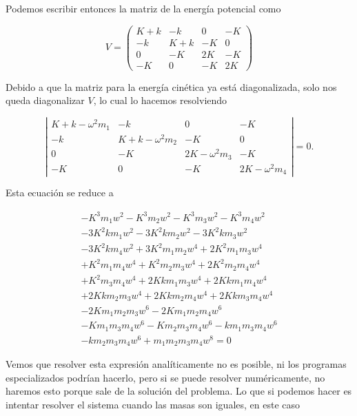 \documentclass[a4paper,10pt]{article}
\numberwithin{equation}{section}
\begin{document}
Podemos escribir entonces la matriz de la energía potencial como

\begin{equation}
 V = \begin{pmatrix}
      K+k & -k & 0 & -K \\
      -k & K+k & - K & 0 \\
      0 & - K & 2K & - K \\
      -K & 0 & - K & 2K
     \end{pmatrix}
\end{equation}

Debido a que la matriz para la energía cinética ya está diagonalizada, solo nos queda 
diagonalizar $V$, lo cual lo hacemos resolviendo

\begin{equation}
 \left|\begin{matrix}
      K+k - \omega^2m_1 & -k & 0 & -K \\
      -k & K+k - \omega^2m_2 & - K & 0 \\
      0 & - K & 2K -  \omega^2m_3 & - K \\
      -K & 0 & - K & 2K -  \omega^2m_4
     \end{matrix}\right| = 0.
\end{equation}

Esta ecuación se reduce a 

\begin{align}
 - K^{3} m_{1} w^{2} - K^{3} m_{2} w^{2} - K^{3} m_{3} w^{2} - K^{3} m_{4} w^{2} \\
 - 3 K^{2} k m_{1} w^{2} - 3 K^{2} k m_{2} w^{2} - 3 K^{2} k m_{3} w^{2} \\
 - 3 K^{2} k m_{4} w^{2} + 3 K^{2} m_{1} m_{2} w^{4} + 2 K^{2} m_{1} m_{3} w^{4}\\
 + K^{2} m_{1} m_{4} w^{4} + K^{2} m_{2} m_{3} w^{4} + 2 K^{2} m_{2} m_{4} w^{4} \\
 + K^{2} m_{3} m_{4} w^{4} + 2 K k m_{1} m_{3} w^{4} + 2 K k m_{1} m_{4} w^{4} \\
 + 2 K k m_{2} m_{3} w^{4} + 2 K k m_{2} m_{4} w^{4} + 2 K k m_{3} m_{4} w^{4} \\
 - 2 K m_{1} m_{2} m_{3} w^{6} - 2 K m_{1} m_{2} m_{4} w^{6} \\
 - K m_{1} m_{3} m_{4} w^{6} - K m_{2} m_{3} m_{4} w^{6} - k m_{1} m_{3} m_{4} w^{6} \\
 - k m_{2} m_{3} m_{4} w^{6} + m_{1} m_{2} m_{3} m_{4} w^{8} = 0
\end{align}

Vemos que resolver esta expresión analíticamente no es posible, ni 
los programas especializados podrían hacerlo, pero si se puede resolver numéricamente,
no haremos esto porque sale de la solución del problema. Lo que si podemos hacer 
es intentar resolver el sistema cuando las masas son iguales, en este caso
\end{document}
